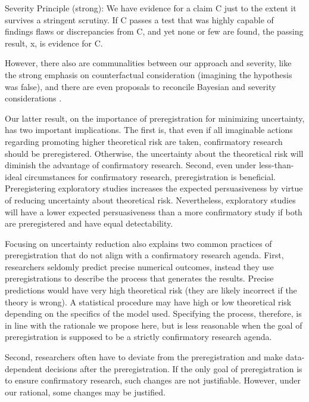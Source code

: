 \documentclass[jou,a4paper]{apa7}
\begin{document}
\begin{displayquote}
Severity Principle (strong): We have evidence for a claim C just to the extent it survives a stringent scrutiny. If C passes a test that was highly capable of findings flaws or discrepancies from C, and yet none or few are found, the passing result, x, is evidence for C.
\end{displayquote}

However, there also are communalities between our approach and severity, like the strong emphasis on counterfactual consideration (imagining the hypothesis was false), and there are even proposals to reconcile Bayesian and severity considerations \parencite{vandongenBayesianPerspectiveSeverity2023}.\par
Our latter result, on the importance of preregistration for minimizing uncertainty, has two important implications.
The first is, that even if all imaginable actions regarding promoting higher theoretical risk are taken, confirmatory research should be preregistered.
Otherwise, the uncertainty about the theoretical risk will diminish the advantage of confirmatory research.
Second, even under less-than-ideal circumstances for confirmatory research, preregistration is beneficial.
Preregistering exploratory studies increases the expected persuasiveness by virtue of reducing uncertainty about theoretical risk.
Nevertheless, exploratory studies will have a lower expected persuasiveness than a more confirmatory study if both are preregistered and have equal detectability.\par
Focusing on uncertainty reduction also explains two common practices of preregistration that do not align with a confirmatory research agenda.
First, researchers seldomly predict precise numerical outcomes, instead they use preregistrations to describe the process that generates the results.
Precise predictions would have very high theoretical risk (they are likely incorrect if the theory is wrong).
A statistical procedure may have high or low theoretical risk depending on the specifics of the model used.
Specifying the process, therefore, is in line with the rationale we propose here, but is less reasonable when the goal of preregistration is supposed to be a strictly confirmatory research agenda.\par
Second, researchers often have to deviate from the preregistration and make data-dependent decisions after the preregistration.
If the only goal of preregistration is to ensure confirmatory research, such changes are not justifiable.
However, under our rational, some changes may be justified.
\end{document}
